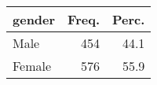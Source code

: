 \begin{table}[ht]
\centering
\begin{tabular}{lrr}
  \hline
gender & Freq. & Perc. \\ 
  \hline
Male & 454 & 44.1 \\ 
  Female & 576 & 55.9 \\ 
   \hline
\end{tabular}
\end{table}
